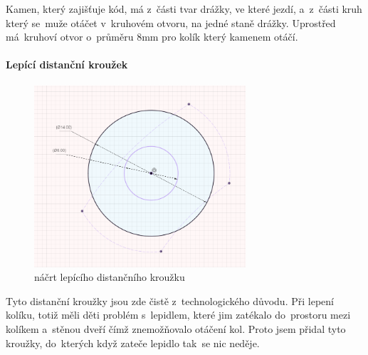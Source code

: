 Kamen, který zajišťuje kód, má z~části tvar drážky, ve které jezdí, a~z~části kruh který se~muže otáčet v~kruhovém otvoru, na jedné staně drážky.
Uprostřed má~kruhoví otvor o~průměru 8mm pro kolík který kamenem otáčí.

\paragraph{Lepící distanční kroužek}

\begin{figure}
    \includegraphics[width=0.7\textwidth]{kapitoly/obrazky/M3/lepici_distance.png}
    \caption{náčrt lepícího distančního kroužku}
    \label{fig:M3-lepici-distance}
\end{figure}

Tyto distanční kroužky jsou zde čistě z~technologického důvodu. Při lepení kolíku, totiž měli děti problém s~lepidlem, které jim zatékalo do~prostoru mezi kolíkem 
a~stěnou dveří čímž znemožňovalo otáčení kol. Proto jsem přidal tyto kroužky, do~kterých když zateče lepidlo tak~se nic neděje.

\newpage